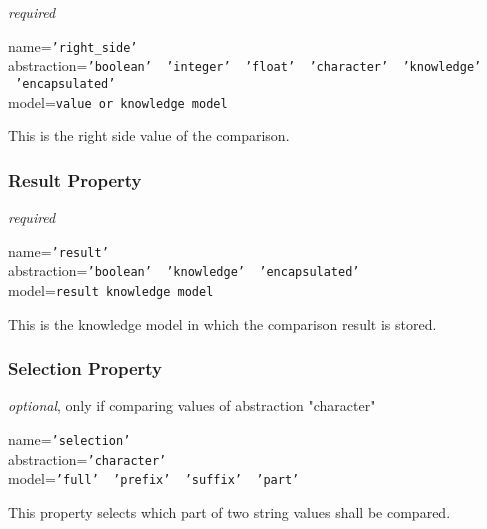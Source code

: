 \emph{required}

name=\texttt{'right\_side'}\\
abstraction=\texttt{'boolean' \vline\ 'integer' \vline\ 'float' \vline\ 'character' \vline\ 'knowledge' \vline\ 'encapsulated'}\\
model=\texttt{value or knowledge model}

This is the right side value of the comparison.

\subsubsection{Result Property}

\emph{required}

name=\texttt{'result'}\\
abstraction=\texttt{'boolean' \vline\ 'knowledge' \vline\ 'encapsulated'}\\
model=\texttt{result knowledge model}

This is the knowledge model in which the comparison result is stored.

\subsubsection{Selection Property}

\emph{optional}, only if comparing values of abstraction "character"

name=\texttt{'selection'}\\
abstraction=\texttt{'character'}\\
model=\texttt{'full' \vline\ 'prefix' \vline\ 'suffix' \vline\ 'part'}

This property selects which part of two string values shall be compared.
